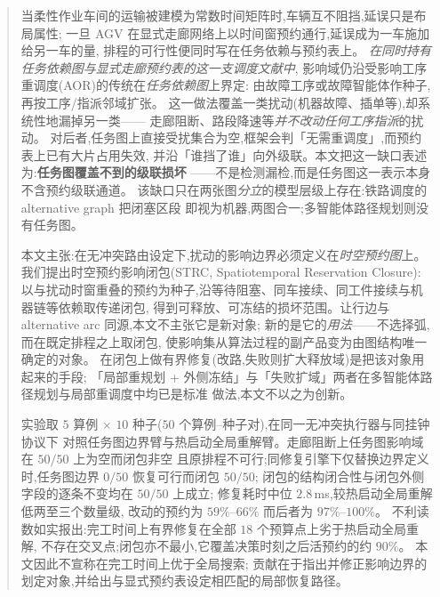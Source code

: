 \documentclass[manuscript,screen,review]{acmart}
\providecommand{\STRC}{\textsc{STRC}}
\begin{document}
\begin{abstract}
当柔性作业车间的运输被建模为常数时间矩阵时,车辆互不阻挡,延误只是布局属性;
一旦 AGV 在显式走廊网络上以时间窗预约通行,延误成为一车施加给另一车的量,
排程的可行性便同时写在任务依赖与预约表上。
\emph{在同时持有任务依赖图与显式走廊预约表的这一支调度文献中},
影响域仍沿受影响工序重调度(AOR)的传统在\emph{任务依赖图}上界定:
由故障工序或故障智能体作种子,再按工序/指派邻域扩张。
这一做法覆盖一类扰动(机器故障、插单等),却系统性地漏掉另一类——
走廊阻断、路段降速等\emph{并不改动任何工序指派}的扰动。
对后者,任务图上直接受扰集合为空,框架会判「无需重调度」,而预约表上已有大片占用失效,
并沿「谁挡了谁」向外级联。本文把这一缺口表述为:\textbf{任务图覆盖不到的级联损坏}
——不是检测漏检,而是任务图这一表示本身不含预约级联通道。
该缺口只在两张图\emph{分立}的模型层级上存在:铁路调度的 alternative graph 把闭塞区段
即视为机器,两图合一;多智能体路径规划则没有任务图。

本文主张:在无冲突路由设定下,扰动的影响边界必须定义在\emph{时空预约图}上。
我们提出时空预约影响闭包(\STRC, Spatiotemporal Reservation Closure):
以与扰动时窗重叠的预约为种子,沿等待阻塞、同车接续、同工件接续与机器链等依赖取传递闭包,
得到可释放、可冻结的损坏范围。让行边与 alternative arc 同源,本文不主张它是新对象;
新的是它的\emph{用法}——不选择弧,而在既定排程之上取闭包,
使影响集从算法过程的副产品变为由图结构唯一确定的对象。
在闭包上做有界修复(改路,失败则扩大释放域)是把该对象用起来的手段;
「局部重规划 + 外侧冻结」与「失败扩域」两者在多智能体路径规划与局部重调度中均已是标准
做法,本文不以之为创新。

实验取 $5$ 算例 $\times$ $10$ 种子($50$ 个算例--种子对),在同一无冲突执行器与同挂钟协议下
对照任务图边界臂与热启动全局重解臂。走廊阻断上任务图影响域在 $50/50$ 上为空而闭包非空
且原排程不可行;同修复引擎下仅替换边界定义时,任务图边界 $0/50$ 恢复可行而闭包 $50/50$;
闭包的结构闭合性与闭包外侧字段的逐条不变均在 $50/50$ 上成立;
修复耗时中位 $2.8$\,ms,较热启动全局重解低两至三个数量级,
改动的预约为 $59\%$--$66\%$ 而后者为 $97\%$--$100\%$。
不利读数如实报出:完工时间上有界修复在全部 $18$ 个预算点上劣于热启动全局重解,
不存在交叉点;闭包亦不最小,它覆盖决策时刻之后活预约的约 $90\%$。
本文因此不宣称在完工时间上优于全局搜索;
贡献在于指出并修正影响边界的划定对象,并给出与显式预约表设定相匹配的局部恢复路径。
\end{abstract}
\end{document}

